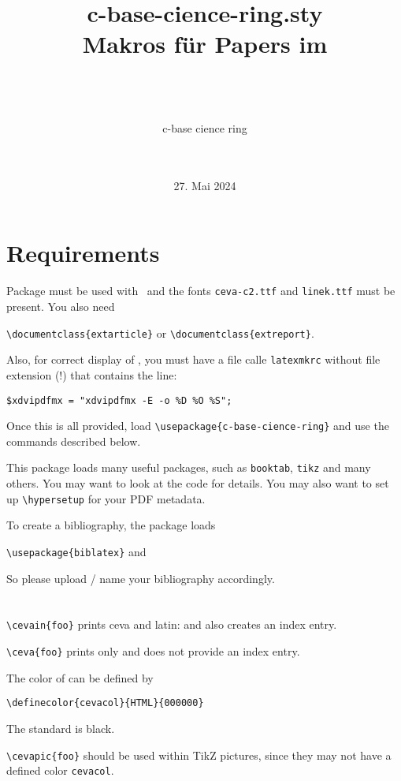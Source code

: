 \documentclass[14pt,ngerman]{extarticle}  %
\title{
    {c-base-cience-ring.sty} \\
    Makros für Papers im\\ \cevain{c-base cience ring}
    }
\author{
    \resizebox{8cm}{!}{}\\\smallskip\\\cevain{ccr}\\
    c-base cience ring\\\smallskip\\
    \cevain{penta}\\ \makeatletter {\texttt{penta@c-base.org}}\makeatother
    }
\date{27. Mai 2024}
\begin{document}
\maketitle

\setlength{\parskip}{2ex}
\setlength{\parindent}{0ex}
 
\section{Requirements}

Package must be used with \XeLaTeX\ and the fonts \verb|ceva-c2.ttf| and \verb|linek.ttf| must be present. You also need

\verb|\documentclass{extarticle}| or \verb|\documentclass{extreport}|. 

Also, for correct display of , you must have a file calle \verb|latexmkrc| without file extension (!) that contains the line:

\verb|$xdvipdfmx = "xdvipdfmx -E -o %D %O %S";|

Once this is all provided, load \verb|\usepackage{c-base-cience-ring}| and use the commands described below.

This package loads many useful packages, such as \verb|booktab|, \verb|tikz| and many others. You may want to look at the code for details. You may also want to set up \verb|\hypersetup| for your PDF metadata.

To create a bibliography, the package loads

\verb|\usepackage{biblatex}| and \verb||

So please upload / name your bibliography accordingly.

\section{}


\verb|\cevain{foo}| prints ceva and latin:  and also creates an index entry.

\verb|\ceva{foo}| prints only  and does not provide an index entry.

The color of  can be defined by

\verb|\definecolor{cevacol}{HTML}{000000}| 

The standard is black.

\verb|\cevapic{foo}| should be used within TikZ pictures, since they may not have a defined color \verb|cevacol|.
\end{document}
